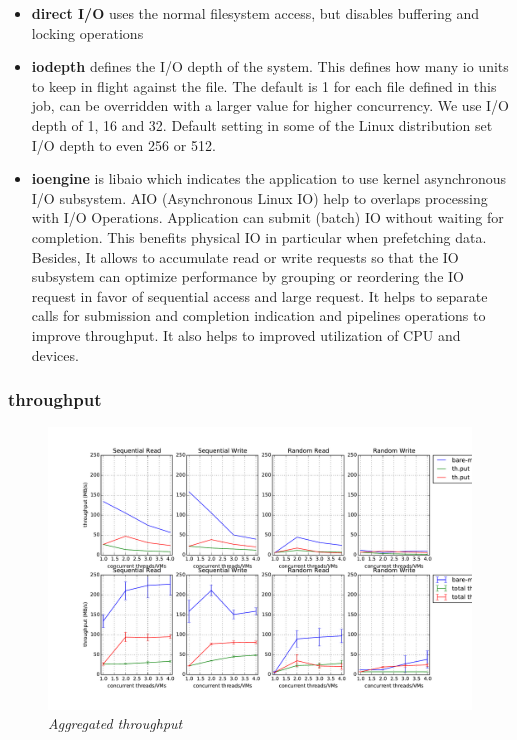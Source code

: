 \documentclass{acmsig}
\begin{document}
\begin{itemize}
\begin{itemize}
  \end{itemize}
  \item \textbf{direct I/O} uses the normal filesystem access, but disables buffering and locking operations
  \item \textbf{iodepth} defines the I/O depth of the system. This defines how many io units to keep in flight against the file. The default is 1 for each file defined in this job, can be overridden with a larger value for higher concurrency. We use I/O depth of 1, 16 and 32. Default setting in some of the Linux distribution set I/O depth to even 256 or 512.
  \item \textbf{ioengine} is libaio which indicates the application to use kernel asynchronous I/O subsystem. AIO (Asynchronous Linux IO) help to overlaps processing with I/O Operations. Application can submit (batch) IO without waiting for completion. This benefits physical IO in particular when prefetching data. Besides, It allows to accumulate read or write requests so that the IO subsystem can optimize performance by grouping or reordering the IO request in favor of sequential access and large request. It helps to separate calls for submission and completion indication and pipelines operations to improve throughput. It also helps to improved utilization of CPU and devices.
\end{itemize}

\subsubsection{throughput}
\begin{figure}[t]
  \includegraphics[scale=0.5]{throughput}
  \caption{\textit{Aggregated throughput}}
  \label{fig:throughput}
\end{figure}
\end{document}
